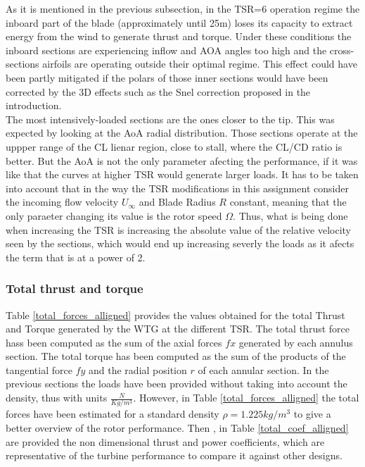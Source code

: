 As it is mentioned in the previous subsection, in the TSR=6 operation regime the inboard part of the blade (approximately until 25m) loses its capacity to extract energy from the wind to generate thrust and torque. Under these conditions the inboard sections are experiencing inflow and AOA angles too high and the cross-sections airfoils are operating outside their optimal regime. This effect could have been partly mitigated if the polars of those inner sections would have been corrected by the 3D effects such as the Snel correction proposed in the introduction. \\

The most intensively-loaded sections are the ones closer to the tip. This was expected by looking at the AoA radial distribution. Those sections operate at the uppper range of the CL lienar region, close to stall, where the CL/CD ratio is better. But the AoA is not the only parameter afecting the performance, if it was like that the curves at higher TSR would generate larger loads. It has to be taken into account that in the way the TSR modifications in this assignment consider the incoming flow velocity $U_{\infty}$ and Blade Radius $R$ constant, meaning that the only paraeter changing its value is the rotor speed $\Omega$. Thus, what is being done when increasing the TSR is increasing the absolute value of the relative velocity seen by the sections, which would end up increasing severly the loads as it afects the term that is at a power of 2. 

\subsubsection{\textbf{Total thrust and torque} }

Table \ref{total_forces_alligned} provides the values obtained for the total Thrust and Torque generated by the WTG at the different TSR. The total thrust force hass been computed as the sum of the axial forces $fx$ generated by each annulus section. The total torque has been computed as the sum of the products of the tangential force $fy$ and the radial position $r$ of each annular section. In the previous sections the loads have been provided without taking into account the density, thus with units $ \frac{N}{Kg/m^3} $. However, in Table \ref{total_forces_alligned} the total forces have been estimated for a standard density $\rho = 1.225 kg/m^3$ to give a better overview of the rotor performance. Then , in Table \ref{total_coef_alligned} are provided the non dimensional thrust and power coefficients, which are representative of the turbine performance to compare it against other designs.

